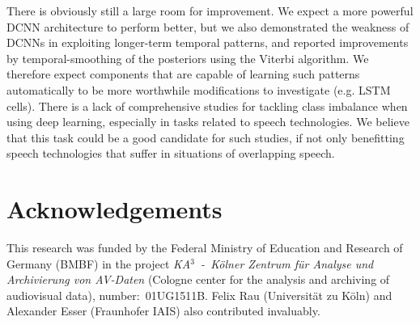 \documentclass[a4paper]{article}
\begin{document}
There is obviously still a large room for improvement.
We expect a more powerful DCNN architecture to perform better,
but we also demonstrated the weakness of DCNNs in exploiting longer-term temporal patterns,
and reported improvements by temporal-smoothing of the posteriors using the Viterbi algorithm.
We therefore expect components that are capable of learning such patterns automatically to be more worthwhile modifications to investigate (e.g. LSTM cells).
There is a lack of comprehensive studies for tackling class imbalance when using deep learning,
especially in tasks related to speech technologies.
We believe that this task could be a good candidate for such studies,
if not only benefitting speech technologies that suffer in situations of overlapping speech.

\section{Acknowledgements}
This research was funded by the Federal Ministry of Education and Research of Germany (BMBF) in the project \textit{KA$^3$~-~K{\"o}lner Zentrum für Analyse und Archivierung von AV-Daten} (Cologne center for the analysis and archiving of audiovisual data), number:~01UG1511B.
Felix Rau (Universit{\"a}t zu K{\"o}ln) and Alexander Esser (Fraunhofer IAIS) also contributed invaluably.



\end{document}
